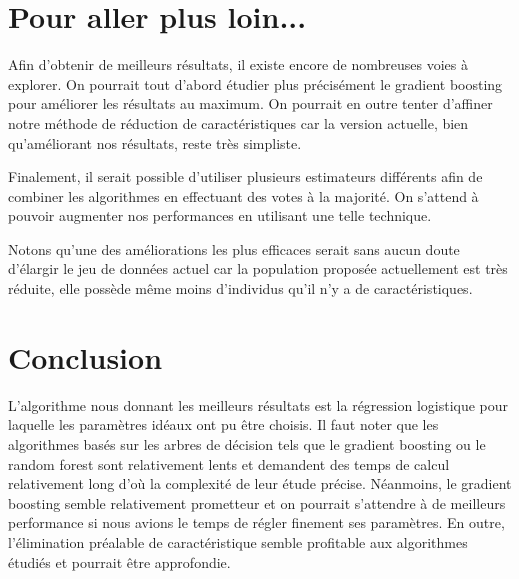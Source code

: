 \documentclass[11pt,a4paper]{article}
\begin{document}
\section{Pour aller plus loin...}
	Afin d'obtenir de meilleurs résultats, il existe encore de nombreuses voies à explorer. On pourrait tout d'abord étudier plus précisément le gradient boosting pour améliorer les résultats au maximum. On pourrait en outre tenter d'affiner notre méthode de réduction de caractéristiques car la version actuelle, bien qu'améliorant nos résultats, reste très simpliste.

	Finalement, il serait possible d'utiliser plusieurs estimateurs différents afin de combiner les algorithmes en effectuant des votes à la majorité. On s'attend à pouvoir augmenter nos performances en utilisant une telle technique.

	Notons qu'une des améliorations les plus efficaces serait sans aucun doute d'élargir le jeu de données actuel car la population proposée actuellement est très réduite, elle possède même moins d'individus qu'il n'y a de caractéristiques.

\section{Conclusion}
	L'algorithme nous donnant les meilleurs résultats est la régression logistique pour laquelle les paramètres idéaux ont pu être choisis.
	Il faut noter que les algorithmes basés sur les arbres de décision tels que le gradient boosting ou le random forest sont relativement lents et demandent des temps de calcul relativement long d'où la complexité de leur étude précise. Néanmoins, le gradient boosting semble relativement prometteur et on pourrait s'attendre à de meilleurs performance si nous avions le temps de régler finement ses paramètres. En outre, l'élimination préalable de caractéristique semble profitable aux algorithmes étudiés et pourrait être approfondie.




%
\end{document}
